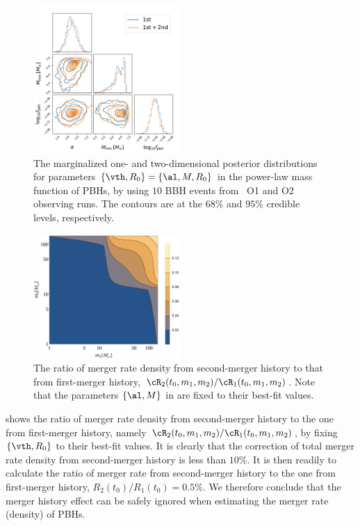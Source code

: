 \documentclass[twocolumn]{aastex631}
\begin{document}
\begin{figure}[htbp!]
	\centering
	\includegraphics[width=0.5\textwidth]{post-power.pdf}
	\caption{\label{posterior-power}
		The marginalized one- and two-dimensional posterior distributions for 
    parameters $\{\vth, R_0\} = \{\al, M, R_0\}$ in the power-law mass function 
    of PBHs, by using $10$ BBH events from \lvc\ O1 and O2 observing runs.
    The contours are at the $68\%$ and $95\%$ credible levels, respectively. 
	}
\end{figure}

\begin{figure}[htbp!]
	\centering
	\includegraphics[width=0.5\textwidth]{ratio-power.pdf}
	\caption{\label{ratio-power}
		The ratio of merger rate density from second-merger history
        to that from first-merger history,
        $\cR_2(t_0, m_1, m_2)/\cR_1(t_0, m_1, m_2)$. Note that the parameters $\{\al, M\}$ in  are fixed to their best-fit values.
	}
\end{figure}

 shows the ratio of merger rate density from second-merger history
to the one from first-merger history, namely 
$\cR_2(t_0, m_1, m_2)/\cR_1(t_0, m_1, m_2)$, by fixing $\{\vth, R_0\}$ to their best-fit values.
It is clearly that the correction of total merger rate density from 
second-merger history is less than $10\%$.
It is then readily to calculate the ratio of merger rate from 
second-merger history to the one from first-merger history, 
$R_2(t_0)/R_1(t_0) = 0.5\%$.
We therefore conclude that the merger history effect can be safely ignored
when estimating the merger rate (density) of PBHs.
\end{document}

